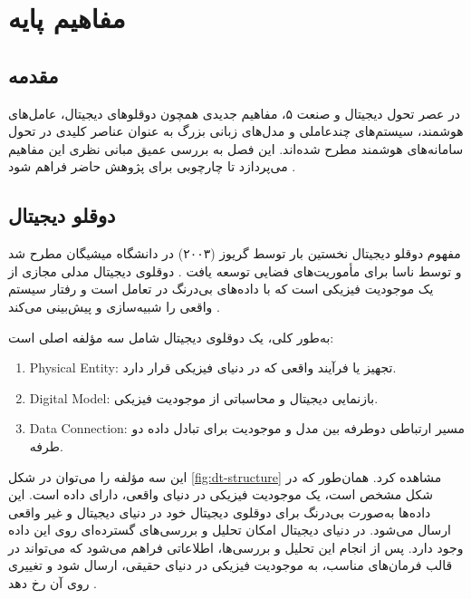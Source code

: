 \documentclass[a4paper,fleqn]{report}
\begin{document}
\section{مفاهیم پایه}\label{chap:brain}

\subsection{مقدمه}

در عصر تحول دیجیتال و صنعت ۵، مفاهیم جدیدی همچون دوقلوهای دیجیتال، عامل‌های هوشمند، سیستم‌های چندعاملی و مدل‌های زبانی بزرگ به عنوان عناصر کلیدی در تحول سامانه‌های هوشمند مطرح شده‌اند. این فصل به بررسی عمیق مبانی نظری این مفاهیم می‌پردازد تا چارچوبی برای پژوهش حاضر فراهم شود \cite{barricelli2019survey,tao2019digital,grieves2017digital}.

\subsection{دوقلو دیجیتال}

مفهوم دوقلو دیجیتال نخستین بار توسط گریوز (۲۰۰۳) در دانشگاه میشیگان مطرح شد و توسط ناسا برای مأموریت‌های فضایی توسعه یافت \cite{grieves2017digital}. دوقلوی دیجیتال مدلی مجازی از یک موجودیت فیزیکی است که با داده‌های بی‌درنگ در تعامل است و رفتار سیستم واقعی را شبیه‌سازی و پیش‌بینی می‌کند \cite{barricelli2019survey,qi2021digital,jiang2023digital}. 

به‌طور کلی، یک دوقلوی دیجیتال شامل سه مؤلفه اصلی است:
\begin{enumerate}
	\item \gls{Physical Entity}: تجهیز یا فرآیند واقعی که در دنیای فیزیکی قرار دارد.
	\item \gls{Digital Model}: بازنمایی دیجیتال و محاسباتی از موجودیت فیزیکی.
	\item \gls{Data Connection}: مسیر ارتباطی دوطرفه بین مدل و موجودیت برای تبادل داده دو طرفه.
\end{enumerate}

این سه مؤلفه را می‌توان در شکل \ref{fig:dt-structure} مشاهده کرد. همان‌طور که در شکل مشخص است، یک موجودیت فیزیکی در دنیای واقعی، دارای داده است. این داده‌ها به‌صورت بی‌درنگ برای دوقلوی دیجیتال خود در دنیای دیجیتال و غیر واقعی ارسال می‌شود. در دنیای دیجیتال امکان تحلیل و بررسی‌های گسترده‌ای روی این داده وجود دارد. پس از انجام این تحلیل و بررسی‌ها، اطلاعاتی فراهم می‌شود که می‌تواند در قالب فرمان‌های مناسب، به موجودیت فیزیکی در دنیای حقیقی، ارسال شود و تغییری روی آن رخ دهد \cite{lopez2024madtwin}.
\end{document}
